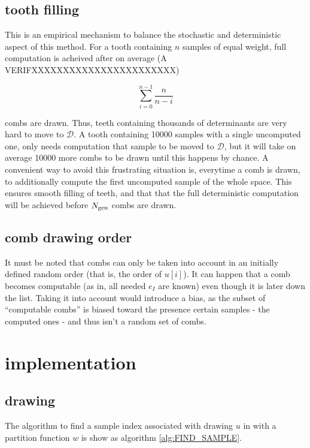 \documentclass[./thesis.tex]{subfiles}
\begin{document}
\subsection*{tooth filling}

This is an empirical mechanism to balance the stochastic and deterministic aspect of this method. For a tooth containing $n$ samples of equal weight, full computation is acheived after on average (A VERIFXXXXXXXXXXXXXXXXXXXXXXX)

\begin{equation}
\sum_{i=0}^{n-1} \frac{n}{n-i}
\end{equation}

combs are drawn. Thus, teeth containing thousands of determinants are very hard to move to $\mathcal{D}$. A tooth containing 10000 samples with a single uncomputed one, only needs computation that sample to be moved to $\mathcal{D}$, but it will take on average 10000 more combs to be drawn until this happens by chance.
A convenient way to avoid this frustrating situation is, everytime a comb is drawn, to additionally compute the first uncomputed sample of the whole space. This ensures smooth filling of teeth, and that that the full deterministic computation will be achieved before ${N_\text{gen}}$ combs are drawn.


\subsection*{comb drawing order}

It must be noted that combs can only be taken into account in an initially defined random order (that is, the order of $u[i]$).
It can happen that a comb becomes computable (as in, all needed $e_I$ are known) even though it is later down the list. Taking it into account would introduce a bias, as the subset of ``computable combs'' is biased toward the presence certain samples - the computed ones - and thus isn't a random set of combs.


\section{implementation}


\subsection{drawing}

The algorithm to find a sample index associated with drawing $u$ in with a partition function $w$ is show as algorithm \ref{alg:FIND_SAMPLE}.
\end{document}
